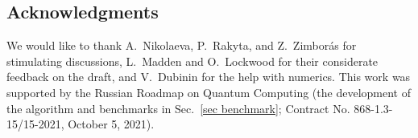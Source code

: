 \documentclass[twocolumn, amsfonts, amssymb, aps, nofootinbib]{revtex4-2}
\begin{document}
\subsection*{Acknowledgments}
We would like to thank A.~Nikolaeva, P.~Rakyta, and Z.~Zimborás for  stimulating discussions, L.~Madden and O.~Lockwood for their considerate feedback on the draft, and V.~Dubinin for the help with numerics.
This work was supported by
the Russian Roadmap on Quantum Computing (the development of the algorithm and benchmarks in Sec.~\ref{sec benchmark}; Contract No. 868-1.3-15/15-2021, October 5, 2021).
\appendix
\begin{figure*}
\end{figure*}
\end{document}
